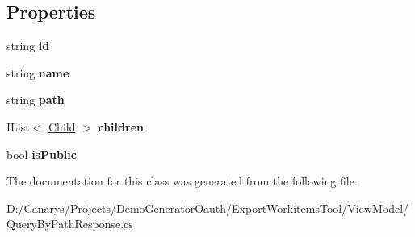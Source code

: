\subsection*{Properties}
\begin{DoxyCompactItemize}
\item 
\mbox{\label{class_templates_generator_tool_1_1_view_model_1_1_query_by_path_response_1_1_child_a7bb7b370e65b4568f53960014ce25d8b}} 
string {\bfseries id}
\item 
\mbox{\label{class_templates_generator_tool_1_1_view_model_1_1_query_by_path_response_1_1_child_a317f814af4cd43405e04fdbb4a088625}} 
string {\bfseries name}
\item 
\mbox{\label{class_templates_generator_tool_1_1_view_model_1_1_query_by_path_response_1_1_child_a66eebbcc3340a0384536c754e20680db}} 
string {\bfseries path}
\item 
\mbox{\label{class_templates_generator_tool_1_1_view_model_1_1_query_by_path_response_1_1_child_a2bc7acbc89b271efa4ee06ac657fc333}} 
I\+List$<$ \mbox{\hyperlink{class_templates_generator_tool_1_1_view_model_1_1_query_by_path_response_1_1_child}{Child}} $>$ {\bfseries children}
\item 
\mbox{\label{class_templates_generator_tool_1_1_view_model_1_1_query_by_path_response_1_1_child_a65fd71c44135d1b773f3f14f503f98ad}} 
bool {\bfseries is\+Public}
\end{DoxyCompactItemize}


The documentation for this class was generated from the following file\+:\begin{DoxyCompactItemize}
\item 
D\+:/\+Canarys/\+Projects/\+Demo\+Generator\+Oauth/\+Export\+Workitems\+Tool/\+View\+Model/Query\+By\+Path\+Response.\+cs\end{DoxyCompactItemize}
